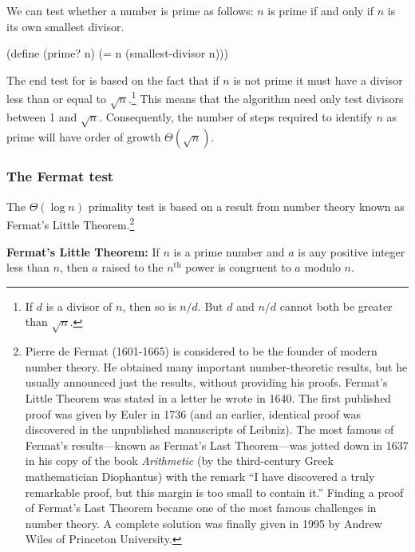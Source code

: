 \noindent
We can test whether a number is prime as follows: \( n \) is prime if and only if
\( n \) is its own smallest divisor.

\begin{codeBlock}
(define (prime? n)
  (= n (smallest-divisor n)))
\end{codeBlock}

\noindent
The end test for  is based on the fact that if \( n \) is not
prime it must have a divisor less than or equal to
\( \sqrt{n} \).\footnote{If \( d \) is a divisor of \( n \), then so is
\( n / d \).  But \( d \) and \( n / d \) cannot both be greater than
\( \sqrt{n} \).}  This means that the algorithm need only test divisors
between 1 and \( \sqrt{n} \).  Consequently, the number of steps required
to identify \( n \) as prime will have order of growth
\( \Theta(\sqrt{n}) \).

\subsubsection*{The Fermat test}

The \( \Theta(\log n) \) primality test is based on a result from
number theory known as Fermat's Little Theorem.\footnote{Pierre de Fermat
(1601-1665) is considered to be the founder of modern number theory.  He
obtained many important number-theoretic results, but he usually announced just
the results, without providing his proofs.  Fermat's Little Theorem was stated
in a letter he wrote in 1640.  The first published proof was given by Euler in
1736 (and an earlier, identical proof was discovered in the unpublished
manuscripts of Leibniz).  The most famous of Fermat's results---known as
Fermat's Last Theorem---was jotted down in 1637 in his copy of the book
\textit{Arithmetic} (by the third-century Greek mathematician Diophantus) with
the remark ``I have discovered a truly remarkable proof, but this margin is too
small to contain it.''  Finding a proof of Fermat's Last Theorem became one of
the most famous challenges in number theory.  A complete solution was finally
given in 1995 by Andrew Wiles of Princeton University.}

\begin{niceQuote}
\textbf{Fermat's Little Theorem:} If \( n \) is a prime number and \( a \) is any
positive integer less than \( n \), then \( a \) raised to the \( n^{\mathrm{th}} \) power is
congruent to \( a \) modulo \( n \).
\end{niceQuote}

